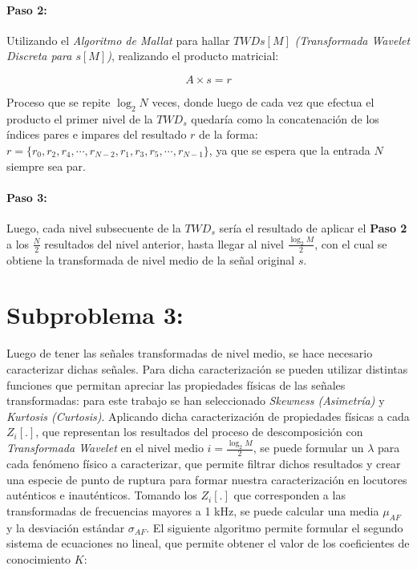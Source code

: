 \documentclass[11pt]{article}
\begin{document}
\paragraph*{Paso 2:}
Utilizando el {\it Algoritmo de Mallat} para hallar \(TWD{s[M]}\) {\it (Transformada Wavelet Discreta para \(s[M]\))}, realizando el producto matricial:

\begin{equation}
    A \times s = r
\end{equation}

Proceso que se repite \(\log_{2}N\) veces, donde luego de cada vez que efectua el producto el primer nivel de la 
\(TWD_{s}\) quedaría como la concatenación de los índices pares e impares del resultado \(r\) de la forma: \(r = \{r_{0}, r_{2}, r_{4}, \cdots, r_{N - 2}, r_{1}, r_{3}, r_{5}, \cdots, r_{N - 1}\}\), ya que se espera 
que la entrada \(N\) siempre sea par.

\paragraph*{Paso 3:}
Luego, cada nivel subsecuente de la \(TWD_{s}\) sería el resultado de aplicar el {\bf Paso 2} a los \(\frac{N}{2}\) resultados del nivel anterior, hasta llegar al nivel \(\frac{\log_{2}M}{2}\), con el cual se obtiene la transformada de 
nivel medio de la señal original \(s\).


\section*{Subproblema 3:}
Luego de tener las señales transformadas de nivel medio, se hace necesario caracterizar dichas señales. Para dicha caracterización se pueden utilizar distintas funciones que permitan apreciar las propiedades físicas de las señales 
transformadas: para este trabajo se han seleccionado {\it Skewness (Asimetría)} y {\it Kurtosis (Curtosis)}. Aplicando dicha caracterización de propiedades físicas a cada \(Z_{i}[.]\), que representan los resultados del proceso de descomposición 
con {\it Transformada Wavelet} en el nivel medio \(i = \frac{\log_{2}M}{2}\), se puede formular un \(\lambda\) para cada fenómeno físico a caracterizar, que permite filtrar dichos resultados y crear una especie de punto de ruptura para formar nuestra caracterización en locutores auténticos e 
inauténticos. Tomando los \(Z_{i}[.]\) que corresponden a las transformadas de frecuencias mayores a 1 kHz, se puede calcular una media \(\mu_{AF}\) y la desviación estándar \(\sigma_{AF}\). El siguiente algoritmo permite formular el segundo 
sistema de ecuaciones no lineal, que permite obtener el valor de los coeficientes de conocimiento \(K\):
\end{document}
